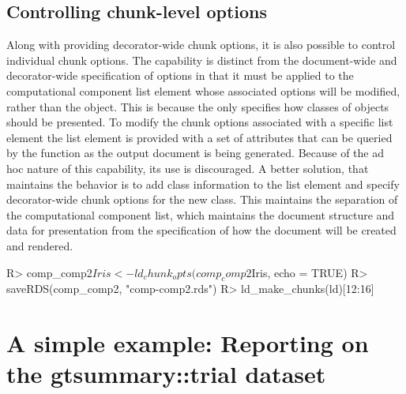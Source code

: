 \documentclass[
]{jss}
\begin{document}
\hypertarget{controlling-chunk-level-options}{%
\subsection{Controlling chunk-level
options}\label{controlling-chunk-level-options}}

Along with providing decorator-wide chunk options, it is also possible
to control individual chunk options. The capability is distinct from the
document-wide and decorator-wide specification of options in that it
must be applied to the computational component list element whose
associated options will be modified, rather than the 
object. This is because the  only specifies how classes
of objects should be presented. To modify the chunk options associated
with a specific list element the list element is provided with a set of
attributes that can be queried by the  function as
the output document is being generated. Because of the ad hoc nature of
this capability, its use is discouraged. A better solution, that
maintains the behavior is to add class information to the list element
and specify decorator-wide chunk options for the new class. This
maintains the separation of the computational component list, which
maintains the document structure and data for presentation from the
specification of how the document will be created and rendered.

\begin{CodeChunk}

\begin{CodeInput}
R> comp_comp2$Iris <- ld_chunk_opts(comp_comp2$Iris, echo = TRUE)
R> saveRDS(comp_comp2, "comp-comp2.rds")
R> ld_make_chunks(ld)[12:16]
\end{CodeInput}

\end{CodeChunk}

\hypertarget{a-simple-example-reporting-on-the-gtsummarytrial-dataset}{%
\section{A simple example: Reporting on the gtsummary::trial
dataset}\label{a-simple-example-reporting-on-the-gtsummarytrial-dataset}}
\end{document}
